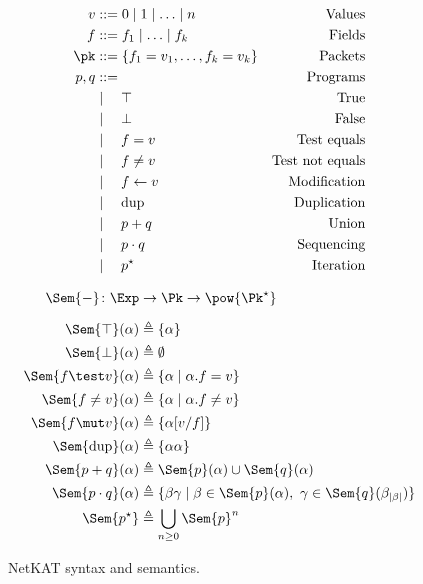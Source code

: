 \begin{figure}
  \begin{minipage}[t]{0.3\textwidth}
  \begin{align*}
      v &::= 0 \mid 1 \mid \ldots \mid n &\text{Values}\\
      f &::= f_1 \mid \ldots \mid f_k &\text{Fields}\\
      \pk &::= \{f_1 = v_1, \ldots, f_k = v_k\} &\text{Packets}\\
      p,q &::= & \text{Programs}
           \\&\mid\quad \top & \text{True}
           \\&\mid\quad \bot & \text{False}
           \\&\mid\quad f = v & \text{Test equals}
           \\&\mid\quad f \neq v & \text{Test not equals}
           \\&\mid\quad f \gets v & \text{Modification}
           \\&\mid\quad \text{dup} & \text{Duplication}
           \\&\mid\quad p + q & \text{Union}
           \\&\mid\quad p \cdot q & \text{Sequencing}
           \\&\mid\quad p^\star & \text{Iteration}
  \end{align*}
  \end{minipage}
  \begin{minipage}[t]{0.4\textwidth}
  \begin{align*}
      \Sem{-} \colon \Exp &\to \Pk \to \pow{\Pk^\star}\\[2mm]
      \Sem{\top}(\alpha) & \triangleq \{ \alpha \}\\
      \Sem{\bot}(\alpha) & \triangleq \emptyset\\
      \Sem{f \test v}(\alpha) & \triangleq \{ \alpha \mid \alpha.f = v \}\\
      \Sem{f \neq v}(\alpha) & \triangleq \{ \alpha \mid \alpha.f \neq v \}\\
      \Sem{f \mut v}(\alpha) & \triangleq \{ \alpha[v/f] \}\\
      \Sem{\text{dup}}(\alpha) & \triangleq \{ \alpha\alpha \}\\
      \Sem{p+q}(\alpha) & \triangleq \Sem{p}(\alpha) \cup \Sem{q}(\alpha)\\
      \Sem{p\cdot q}(\alpha) & \triangleq \{ \beta\gamma \mid \beta \in \Sem{p}(\alpha),\ \gamma \in \Sem{q}(\beta_{|\beta|}) \}\\
      \Sem{p^\star} & \triangleq \bigcup\limits_{n\geq 0} \Sem{p}^n\\
  \end{align*}
  \end{minipage}
  \caption{NetKAT syntax and semantics.}
\end{figure}


